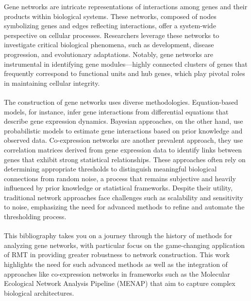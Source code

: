 Gene networks are intricate representations of interactions among genes and their products within biological systems\cite{oldham_conservation_2006}.
These networks, composed of nodes symbolizing genes and edges reflecting interactions\cite{barabasi_network_2004}, offer a system-wide perspective on cellular processes.
Researchers leverage these networks to investigate critical biological phenomena\cite{barabasi_network_2004}, such as development\cite{montoya_ecological_2006}, disease progression\cite{friedman_using_2000}, and evolutionary adaptations\cite{dunne_food-web_2002}.
Notably, gene networks are instrumental in identifying gene modules—highly connected clusters of genes that frequently correspond to functional units and hub genes, which play pivotal roles in maintaining cellular integrity\cite{zhang_general_2005}.
\\\\
The construction of gene networks uses diverse methodologies.
Equation-based models, for instance, infer gene interactions from differential equations that describe gene expression dynamics\cite{deng_molecular_2012}.
Bayesian approaches, on the other hand, use probabilistic models to estimate gene interactions based on prior knowledge and observed data\cite{gerstung_quantifying_2009}.
Co-expression networks are another prevalent approach, they use correlation matrices derived from gene expression data to identify links between genes that exhibit strong statistical relationships\cite{zhang_general_2005}.
These approaches often rely on determining appropriate thresholds to distinguish meaningful biological connections from random noise, a process that remains subjective and heavily influenced by prior knowledge or statistical frameworks.
Despite their utility, traditional network approaches face challenges such as scalability and sensitivity to noise, emphasizing the need for advanced methods to refine and automate the thresholding process\cite{deng_molecular_2012}.
\\\\
This bibliography takes you on a journey through the history of methods for analyzing gene networks, with particular focus on the game-changing application of RMT in providing greater robustness to network construction.
This work highlights the need for such advanced methods as well as the integration of approaches like co-expression networks in frameworks such as the Molecular Ecological Network Analysis Pipeline (MENAP) that aim to capture complex biological architectures.